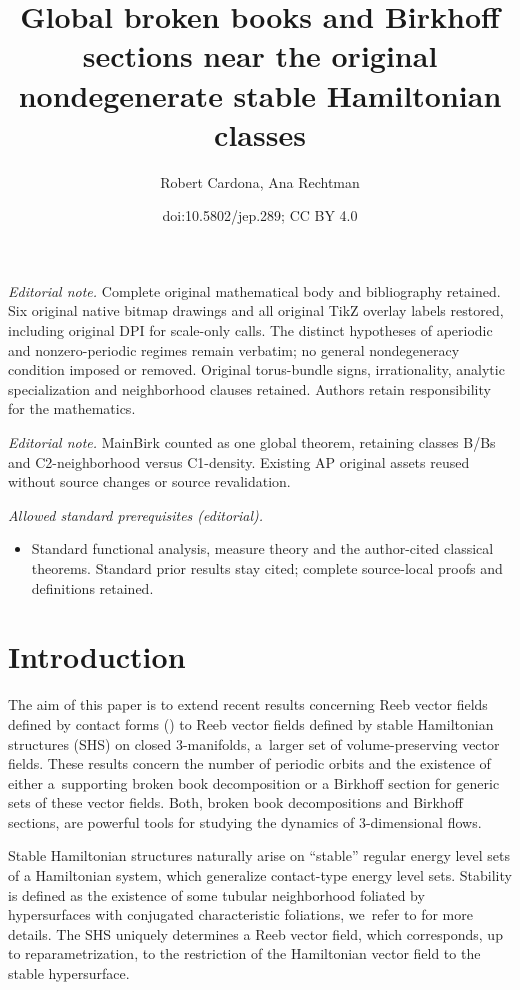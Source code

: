 \documentclass[10pt]{amsart}
\title{Global broken books and Birkhoff sections near the original nondegenerate stable Hamiltonian classes}
\author{Robert Cardona, Ana Rechtman}
\date{doi:10.5802/jep.289; CC BY 4.0}
\newcommand{\threemanifolds}{$3$\nobreakdash-mani\-folds\xspace}
\theoremstyle{definition}
\providecommand{\mainmatter}{}\providecommand{\backmatter}{}
\begin{document}
\maketitle
\noindent\textit{Editorial note.} Complete original mathematical body and bibliography retained. Six original native bitmap drawings and all original TikZ overlay labels restored, including original DPI for scale-only calls. The distinct hypotheses of aperiodic and nonzero-periodic regimes remain verbatim; no general nondegeneracy condition imposed or removed. Original torus-bundle signs, irrationality, analytic specialization and neighborhood clauses retained. Authors retain responsibility for the mathematics.\par\medskip
\noindent\textit{Editorial note.} MainBirk counted as one global theorem, retaining classes B/Bs and C2-neighborhood versus C1-density. Existing AP original assets reused without source changes or source revalidation.\par\medskip
\noindent\textit{Allowed standard prerequisites (editorial).}\begin{itemize}
\item Standard functional analysis, measure theory and the author-cited classical theorems. Standard prior results stay cited; complete source-local proofs and definitions retained.
\end{itemize}\medskip
\vspace*{-\baselineskip}
\tableofcontents
\mainmatter

\vspace*{-3.4\baselineskip}\mbox{}
\section{Introduction}\label{sec:intro}

The aim of this paper is to extend recent results concerning Reeb vector fields defined by contact forms (\cite{CDR,CDHR,CM}) to Reeb vector fields defined by stable Hamiltonian structures (SHS) on closed \threemanifolds, a~larger set of volume-preserving vector fields. These results concern the number of periodic orbits and the existence of either a~supporting broken book decomposition or a Birkhoff section for generic sets of these vector fields. Both, broken book decompositions and Birkhoff sections, are powerful tools for studying the dynamics of 3-dimensional flows.

Stable Hamiltonian structures naturally arise on ``stable'' regular energy level sets of a Hamiltonian system, which generalize contact-type energy level sets. Stability is defined as the existence of some tubular neighborhood foliated by hypersurfaces with conjugated characteristic foliations, we~refer to \cite{HZ,CV1} for more details. The SHS uniquely determines a Reeb vector field, which corresponds, up to reparametrization, to the restriction of the Hamiltonian vector field to the stable hypersurface.
\end{document}
